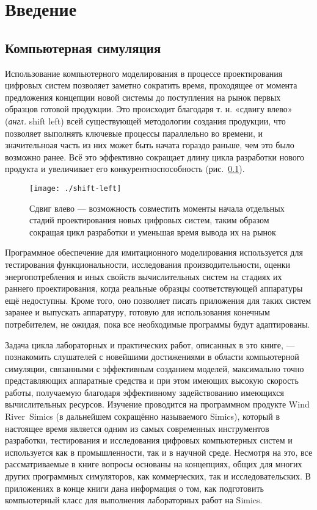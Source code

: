 \chapter*{Введение}\label{chap:overview}

\section{Компьютерная симуляция}

Использование компьютерного моделирования в процессе проектирования цифровых систем позволяет заметно сократить время, проходящее от момента предложения концепции новой системы до поступления на рынок первых образцов готовой продукции. Это происходит благодаря т. н. «сдвигу влево» (\textit{англ.} shift left) всей существующей методологии создания продукции, что позволяет выполнять ключевые процессы параллельно во времени, и значительноая часть из них может быть начата гораздо раньше, чем это было возможно ранее. Всё это эффективно сокращает длину цикла разработки нового продукта и увеличивает его конкурентноспособность (рис.~\ref{fig:shift-left}).

\begin{figure}[htb]
    \centering
    \texttt{[image: ./shift-left]}
    \caption[Сдвиг влево]{Сдвиг влево --- возможность совместить моменты начала отдельных стадий проектирования новых цифровых систем, таким образом сокращая цикл разработки и уменьшая время вывода их на рынок}
    \label{fig:shift-left}
\end{figure}

Программное обеспечение для имитационного моделирования используется для тестирования функциональности, исследования производительности, оценки энергопотребления и иных свойств вычислительных систем на стадиях их раннего проектирования, когда реальные образцы соответствующей аппаратуры ещё недоступны. Кроме того, оно позволяет писать приложения для таких систем заранее и выпускать аппаратуру, готовую для использования конечным потребителем, не ожидая, пока все необходимые программы будут адаптированы.

Задача цикла лабораторных и практических работ, описанных в это книге, --- познакомить слушателей с новейшими достижениями в области компьютерной симуляции, связанными с эффективным созданием моделей, максимально точно представляющих аппаратные средства и при этом имеющих высокую скорость работы, получаемую благодаря эффективному задействованию имеющихся вычислительных ресурсов. Изучение проводится на программном продукте Wind River\textregistered\ Simics (в дальнейшем сокращённо называемого Simics), который в настоящее время является одним из самых современных инструментов разработки, тестирования и исследования цифровых компьютерных систем и используется как в промышленности, так и в научной среде. Несмотря на это, все рассматриваемые в книге вопросы основаны на концепциях, общих для многих других программных симуляторов, как коммерческих, так и исследовательских. В приложениях в конце книги дана информация о том, как подготовить компьютерный класс для выполнения лабораторных работ на Simics.

